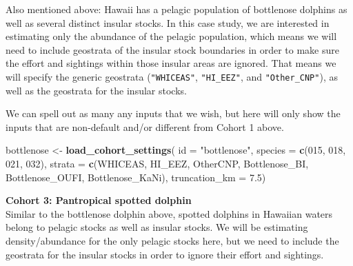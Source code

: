 \documentclass[
]{book}
\newenvironment{Shaded}{\begin{snugshade}}{\end{snugshade}}
\newcommand{\AttributeTok}[1]{\textcolor[rgb]{0.13,0.29,0.53}{#1}}
\newcommand{\FloatTok}[1]{\textcolor[rgb]{0.00,0.00,0.81}{#1}}
\newcommand{\FunctionTok}[1]{\textcolor[rgb]{0.13,0.29,0.53}{\textbf{#1}}}
\newcommand{\NormalTok}[1]{#1}
\newcommand{\OtherTok}[1]{\textcolor[rgb]{0.56,0.35,0.01}{#1}}
\newcommand{\StringTok}[1]{\textcolor[rgb]{0.31,0.60,0.02}{#1}}
\begin{document}
Also mentioned above: Hawaii has a pelagic population of bottlenose dolphins as well as several distinct insular stocks. In this case study, we are interested in estimating only the abundance of the pelagic population, which means we will need to include geostrata of the insular stock boundaries in order to make sure the effort and sightings within those insular areas are ignored. That means we will specify the generic geostrata (\texttt{"WHICEAS"}, \texttt{"HI\_EEZ"}, and \texttt{"Other\_CNP"}), as well as the geostrata for the insular stocks.

We can spell out as many any inputs that we wish, but here will only show the inputs that are non-default and/or different from Cohort 1 above.

\begin{Shaded}
\begin{Highlighting}[]
\NormalTok{bottlenose }\OtherTok{\textless{}{-}} \FunctionTok{load\_cohort\_settings}\NormalTok{(}
  \AttributeTok{id =} \StringTok{"bottlenose"}\NormalTok{,}
  \AttributeTok{species =} \FunctionTok{c}\NormalTok{(}\StringTok{\textquotesingle{}015\textquotesingle{}}\NormalTok{, }\StringTok{\textquotesingle{}018\textquotesingle{}}\NormalTok{, }\StringTok{\textquotesingle{}021\textquotesingle{}}\NormalTok{, }\StringTok{\textquotesingle{}032\textquotesingle{}}\NormalTok{),}
  \AttributeTok{strata =} \FunctionTok{c}\NormalTok{(}\StringTok{\textquotesingle{}WHICEAS\textquotesingle{}}\NormalTok{, }\StringTok{\textquotesingle{}HI\_EEZ\textquotesingle{}}\NormalTok{, }\StringTok{\textquotesingle{}OtherCNP\textquotesingle{}}\NormalTok{,}
             \StringTok{\textquotesingle{}Bottlenose\_BI\textquotesingle{}}\NormalTok{, }\StringTok{\textquotesingle{}Bottlenose\_OUFI\textquotesingle{}}\NormalTok{, }\StringTok{\textquotesingle{}Bottlenose\_KaNi\textquotesingle{}}\NormalTok{),}
  \AttributeTok{truncation\_km =} \FloatTok{7.5}\NormalTok{)}
\end{Highlighting}
\end{Shaded}

\textbf{Cohort 3: Pantropical spotted dolphin}\\
Similar to the bottlenose dolphin above, spotted dolphins in Hawaiian waters belong to pelagic stocks as well as insular stocks. We will be estimating density/abundance for the only pelagic stocks here, but we need to include the geostrata for the insular stocks in order to ignore their effort and sightings.
\end{document}
